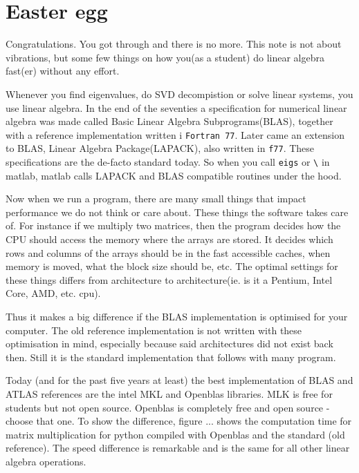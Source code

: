 

\chapter{Easter egg}
\label{chap:easter_egg}

Congratulations. You got through and there is no more. This note is not about
vibrations, but some few things on how you(as a student) do linear algebra
fast(er) without any effort.

Whenever you find eigenvalues, do SVD decompistion or solve linear systems, you
use linear algebra. In the end of the seventies a specification for numerical
linear algebra was made called Basic Linear Algebra Subprograms(BLAS), together
with a reference implementation written i \texttt{Fortran 77}. Later came an
extension to BLAS, Linear Algebra Package(LAPACK), also written in \texttt{f77}.
These specifications are the de-facto standard today. So when you call
\texttt{eigs} or \texttt{\textbackslash} in matlab, matlab calls LAPACK and BLAS
compatible routines under the hood.

Now when we run a program, there are many small things that impact performance
we do not think or care about. These things the software takes care of. For
instance if we multiply two matrices, then the program decides how the CPU
should access the memory where the arrays are stored. It decides which rows and
columns of the arrays should be in the fast accessible caches, when memory is
moved, what the block size should be, etc. The optimal settings for these things
differs from architecture to architecture(ie. is it a Pentium, Intel Core, AMD,
etc. cpu).

Thus it makes a big difference if the BLAS implementation is optimised for your
computer. The old reference implementation is not written with these
optimisation in mind, especially because said architectures did not exist back
then. Still it is the standard implementation that follows with many program.

Today (and for the past five years at least) the best implementation of BLAS and
ATLAS references are the intel MKL and Openblas libraries. MLK is free for
students but not open source. Openblas is completely free and open source -
choose that one. To show the difference, figure ... shows the computation time
for matrix multiplication for python compiled with Openblas and the standard
(old reference). The speed difference is remarkable and is the same for all
other linear algebra operations.

